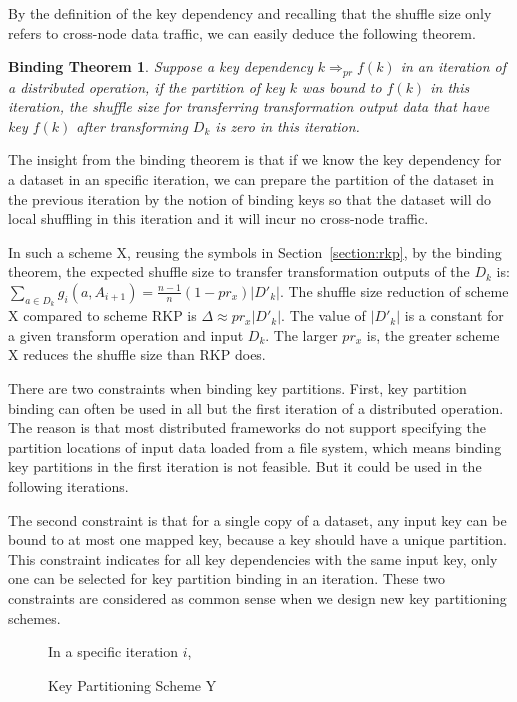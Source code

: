 \documentclass[10pt,journal,compsoc]{IEEEtran}
\makeatletter
\newcommand{\removelatexerror}{\let\@latex@error\@gobble}
\makeatother
\begin{document}
By the definition of the key dependency and recalling that 
the shuffle size only refers to cross-node data traffic,
we can easily deduce the following theorem.
\newtheorem*{theorem*}{\textbf{Binding Theorem}}
\begin{theorem*}\label{thm:binding}
Suppose a key dependency $k \Rightarrow_{pr} f(k)$ in an iteration of a distributed operation,
if the partition of key $k$ was bound to $f(k)$ in this iteration, 
the shuffle size for transferring transformation output data that have key $f(k)$ after transforming $D_k$ is zero in this iteration.
\end{theorem*}

The insight from the binding theorem is that if we know the key dependency
for a dataset in an specific iteration, we can prepare the partition
of the dataset in the previous iteration by the notion of binding keys so that the dataset
will do local shuffling in this iteration and it will incur no cross-node traffic. 

In such a scheme X, reusing the symbols in Section~\ref{section:rkp}, 
by the binding theorem, the expected shuffle size to transfer 
transformation outputs of the $D_k$ is: $\sum_{a \in D_k} g_i(a, A_{i+1}) = \frac{n-1}{n} (1 - pr_x) |D'_{k}|$.
The shuffle size reduction of scheme X compared to scheme RKP is 
$ \Delta \approx pr_x |D'_{k}|$. 
The value of $|D'_{k}|$ is a constant for a given transform operation and input $D_k$. 
The larger $pr_x$ is, the greater scheme X reduces the shuffle size than RKP does. 

There are two constraints when binding key partitions. 
First, key partition binding can often be used in all but the first iteration of a distributed operation.
The reason is that most distributed frameworks do not support specifying the partition locations of input data loaded from a file system, which means 
binding key partitions in the first iteration is not feasible. 
But it could be used in the following iterations.

The second constraint is that for a single copy of a dataset, any input key can be bound to at most one mapped 
key, because a key should have a unique partition. 
This constraint indicates for all key dependencies with the same input key, only one can be selected for key partition binding in an iteration. 
These two constraints are considered as common sense when we design new key partitioning schemes.

\begin{figure}[!t]
\removelatexerror

\begin{algorithm}[H]
  In a specific iteration $i$,

\caption{Key Partitioning Scheme Y}
\label{algo:y}
\end{algorithm}
\end{figure}
\end{document}
